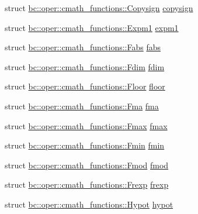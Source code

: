 \begin{DoxyCompactItemize}
\item 
struct \hyperlink{structbc_1_1oper_1_1cmath__functions_1_1Copysign}{bc\+::oper\+::cmath\+\_\+functions\+::\+Copysign} \hyperlink{namespacebc_1_1oper_1_1cmath__functions_a507c8d32d67bcee320c86ec27fa91f06}{copysign}
\item 
struct \hyperlink{structbc_1_1oper_1_1cmath__functions_1_1Expm1}{bc\+::oper\+::cmath\+\_\+functions\+::\+Expm1} \hyperlink{namespacebc_1_1oper_1_1cmath__functions_aba924b6ba76ff04baac47438737889ed}{expm1}
\item 
struct \hyperlink{structbc_1_1oper_1_1cmath__functions_1_1Fabs}{bc\+::oper\+::cmath\+\_\+functions\+::\+Fabs} \hyperlink{namespacebc_1_1oper_1_1cmath__functions_adb8dc835c6378d49c9c0033658207111}{fabs}
\item 
struct \hyperlink{structbc_1_1oper_1_1cmath__functions_1_1Fdim}{bc\+::oper\+::cmath\+\_\+functions\+::\+Fdim} \hyperlink{namespacebc_1_1oper_1_1cmath__functions_a07ecef8fdbd365379759e5599f962e18}{fdim}
\item 
struct \hyperlink{structbc_1_1oper_1_1cmath__functions_1_1Floor}{bc\+::oper\+::cmath\+\_\+functions\+::\+Floor} \hyperlink{namespacebc_1_1oper_1_1cmath__functions_a61b5a3028e62fafc1bced966724253f5}{floor}
\item 
struct \hyperlink{structbc_1_1oper_1_1cmath__functions_1_1Fma}{bc\+::oper\+::cmath\+\_\+functions\+::\+Fma} \hyperlink{namespacebc_1_1oper_1_1cmath__functions_a578a1881628b2fc3eb7df2fbbda8778d}{fma}
\item 
struct \hyperlink{structbc_1_1oper_1_1cmath__functions_1_1Fmax}{bc\+::oper\+::cmath\+\_\+functions\+::\+Fmax} \hyperlink{namespacebc_1_1oper_1_1cmath__functions_a6037d4bf232eb4984507126102c603d6}{fmax}
\item 
struct \hyperlink{structbc_1_1oper_1_1cmath__functions_1_1Fmin}{bc\+::oper\+::cmath\+\_\+functions\+::\+Fmin} \hyperlink{namespacebc_1_1oper_1_1cmath__functions_a5d80d86630278ea2963ab27e7e02aef9}{fmin}
\item 
struct \hyperlink{structbc_1_1oper_1_1cmath__functions_1_1Fmod}{bc\+::oper\+::cmath\+\_\+functions\+::\+Fmod} \hyperlink{namespacebc_1_1oper_1_1cmath__functions_a229f01ea3103351a05016bb1196826fa}{fmod}
\item 
struct \hyperlink{structbc_1_1oper_1_1cmath__functions_1_1Frexp}{bc\+::oper\+::cmath\+\_\+functions\+::\+Frexp} \hyperlink{namespacebc_1_1oper_1_1cmath__functions_af8fc2b20d47595f570eb85326c8af090}{frexp}
\item 
struct \hyperlink{structbc_1_1oper_1_1cmath__functions_1_1Hypot}{bc\+::oper\+::cmath\+\_\+functions\+::\+Hypot} \hyperlink{namespacebc_1_1oper_1_1cmath__functions_af2ee0c2221c0481ebb0ecf8bbe3d2e08}{hypot}

\end{DoxyCompactItemize}
